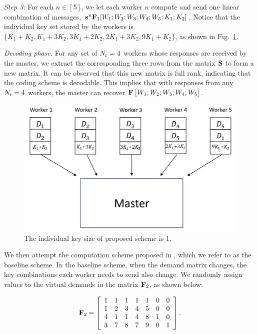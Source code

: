 \documentclass[conference,letterpaper]{IEEEtran}
\newcommand{\tikzmark}[1]{\tikz[overlay,remember picture] \node (#1) {};}
\begin{document}
\begin{example}
{\it Step 3:}
For each \( n \in [5] \), we let each worker $n$ compute and send  one linear combination of messages, ${\bf s}^{n} {\bf F}_1 [W_{1};W_{2};W_{3}; W_{4};W_{5};K_1;K_2]$. Notice that the individual key set stored by the workers is \( \{K_1 + K_2, K_1 + 3K_2, 3K_1 + 2K_2, 2K_1 + 3K_2, 9K_1 + K_2\} \), as shown in Fig.~\ref{fig: our scheme}.

{\it Decoding phase.}
For any set of $N_{\rm r} = 4$ workers whose responses are received by the master, we extract the corresponding three rows from the matrix ${\bf S}$ to form a new matrix. It can be observed that this new matrix is full rank, indicating that the coding scheme is decodable. This implies that with responses from any $N_{\rm r} = 4$ workers, the master can recover ${\bf F} \begin{bmatrix} W_{1};W_{2};W_{3}; W_{4};W_{5} \end{bmatrix}$. 

\begin{figure}%
\centerline{\includegraphics[scale=0.35]{our scheme}}
\caption{\small The individual key size of proposed scheme is 1.}
\label{fig: our scheme}
\end{figure}

We then attempt the computation scheme proposed in \cite{wan2022secure}, which we refer to as the baseline scheme.
 In the baseline scheme, when the demand matrix changes, the key combinations each worker needs to send also change. We randomly assign values to the virtual demands in the matrix \( {\bf F}_2 \), as shown below:

\begin{equation}
{\bf F}_2 = \left[
\begin{array}{ccccccc}
\tikzmark{left1}1 & 1 & 1 & 1 & 1 & \tikzmark{left2} 0 & 0  \\
1 & 2 & 3 & 4 & 5 & 0 & 0 \\
4 & 1 & 1 & 4 & 8 & 1 & 0 \\
3 & 7 & 8 & 7 & 9  \tikzmark{right1}& 0 & 1 \tikzmark{right2} \\
\end{array}
\right].
\label{eq:old F key size}
\end{equation}


\end{example}
\end{document}
